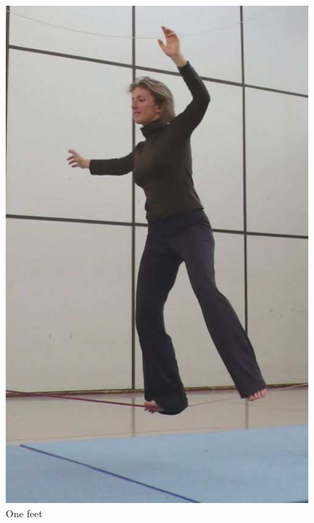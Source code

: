 \begin{figure}[htb]
\begin{minipage}[t]{0.20\linewidth}
		\includegraphics[width=1\linewidth]{Pictures/slacklineBasicOneFeet}
		\caption{One feet \cite{Kroiss2007-ab}}
		\label{fig:slacklineBasicOneFeet}
	\end{minipage}
	\hfill
	\begin{minipage}[t]{0.33\linewidth}
		\centering

\end{minipage}
\end{figure}

